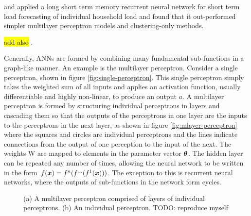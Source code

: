 \citet{Kong2017} and \citet{Kong2018} applied a long short term memory recurrent neural network for short term load forecasting of individual household load and found that it out-performed simpler multilayer perceptron models and clustering-only methods.
\par
\hl{ add also} \citep{Mansouri2014}.
\par
Generally, ANNs are formed by combining many fundamental sub-functions in a graph-like manner. 
An example is the multilayer perceptron.
Consider a single perceptron, shown in figure \ref{fig:single-perceptron}.
This single perceptron simply takes the weighted sum of all inputs and applies an activation function, usually differentiable and highly non-linear, to produce an output $a$.
A multilayer perceptron is formed by structuring individual perceptrons in layers and cascading them so that the outputs of the perceptrons in one layer are the inputs to the perceptrons in the next layer, as shown in figure \ref{fig:mlayer-perceptron} where the squares and circles are individual perceptrons and the lines indicate connections from the output of one perception to the input of the next.
The weights W are mapped to elements in the parameter vector ${\bm{\theta}}$.
The hidden layer can be repeated any number of times, allowing the neural network to be written in the form $f({\bm{x}}) = f^n(f^{\ldots}(f^1({\bm{x}})))$.
The exception to this is recurrent neural networks, where the outputs of sub-functions in the network form cycles.
\begin{figure}[htbp]
	\centering
	\quad\quad
	\caption{(a) A multilayer perceptron comprised of layers of individual perceptrons. (b) An individual perceptron. TODO: reproduce myself}
	\label{fig:simple-ann}
\end{figure}


